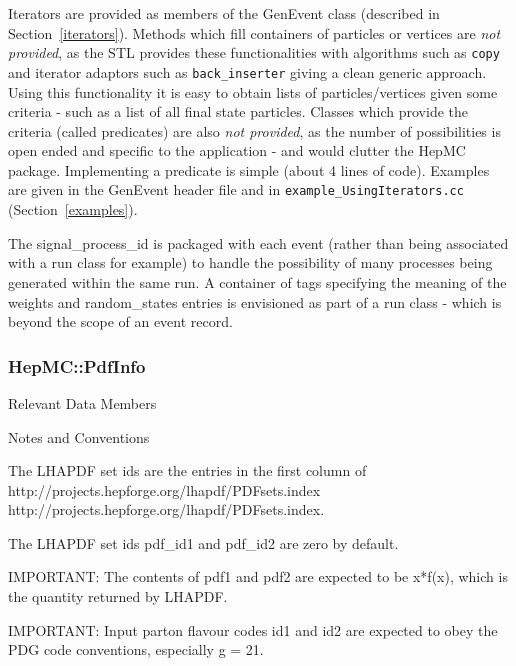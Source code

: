 \documentclass[11pt,letterpaper]{article}
\begin{document}
Iterators are provided as members of the GenEvent class
(described in Section~\ref{iterators}). Methods which fill containers of
particles or vertices are {\it not provided}, as the STL provides these
functionalities with algorithms such as \verb!copy! and iterator adaptors
such as \verb!back_inserter! giving a clean generic approach.
Using this functionality it is easy to obtain lists of
particles/vertices given some criteria - such as a list of all final
state particles. Classes which provide the criteria (called
predicates) are also {\it not provided}, as the number of
possibilities is open ended and specific to the application -
and would clutter the HepMC package. Implementing a predicate is
simple (about 4 lines of code).
Examples are given in the GenEvent header file and in
\verb!example_UsingIterators.cc! (Section~\ref{examples}).

The signal\_process\_id is packaged with each event (rather than being
associated with a run class for example) to handle the possibility of
many processes being generated within the same run. A container of
tags specifying the meaning of the weights and random\_states entries
is envisioned as part of a run class - which is beyond the scope of an
event record.

%
%

\subsubsection{HepMC::PdfInfo}
\begin{myitemize}{Relevant Data Members}
\end{myitemize}
\begin{myitemize}{Notes and Conventions}
  \item The LHAPDF\cite{lhapdf} set ids are the entries in the first column of
	\htmladdnormallink
	{http://projects.hepforge.org/lhapdf/PDFsets.index}
	{http://projects.hepforge.org/lhapdf/PDFsets.index}.
  \item The LHAPDF set ids pdf\_id1 and pdf\_id2 are zero by default.
  \item IMPORTANT: The contents of pdf1 and pdf2 are expected to be x*f(x), 
        which is the quantity returned by LHAPDF.
  \item IMPORTANT: Input parton flavour codes id1 and id2 are expected to 
        obey the PDG code conventions, especially g = 21. 
\end{myitemize}
\end{document}
